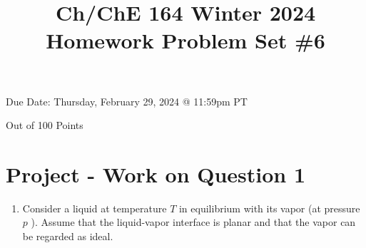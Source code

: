 \documentclass[12pt]{article}
\title{Ch/ChE 164 Winter 2024 
 Homework Problem Set \#6 }
\author{}
\date{}
\begin{document}
\maketitle
Due Date: Thursday, February 29, 2024 @ 11:59pm PT

Out of 100 Points
\section{}
\section*{Project - Work on Question 1}
\begin{enumerate}
  \item Consider a liquid at temperature $T$ in equilibrium with its vapor (at pressure $p$ ). Assume that the liquid-vapor interface is planar and that the vapor can be regarded as ideal.
\end{enumerate}
\end{document}
